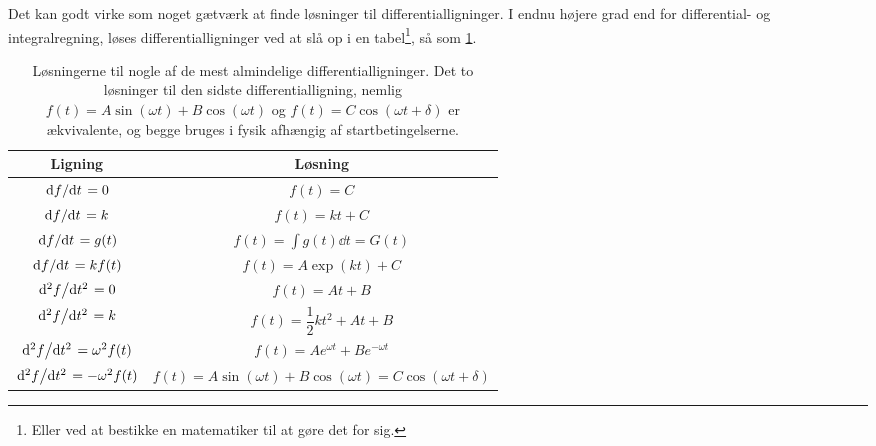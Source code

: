 Det kan godt virke som noget gætværk at finde løsninger til differentialligninger.
I endnu højere grad end for differential- og integralregning, løses differentialligninger ved at slå op i en tabel\footnote{Eller ved at bestikke en matematiker til at gøre det for sig.}, så som \cref{mat:tab:diffligninger}.
%
\setlength{\tabcolsep}{1 em}
\renewcommand{\arraystretch}{1.6}
\begin{table}[]
    \centering
    \begin{tabular}{cc}%
        \toprule
        Ligning & Løsning \\%
        \midrule
        $\dv*{f}{t}=0$ & $f(t)=C$ \\
        $\dv*{f}{t}=k$ & $f(t)=kt+C$ \\
        $\dv*{f}{t}=g(t)$ & $f(t)=\displaystyle\int g(t)\dd{t}=G(t)$ \\%
        $\dv*{f}{t}=kf(t)$ & $f(t)= A\exp(kt)+C$ \\
        $\dv*[2]{f}{t}=0$ & $f(t)=At+B$ \\
        $\dv*[2]{f}{t}=k$ & $f(t)=\dfrac{1}{2}kt^2+At+B$ \\
        $\dv*[2]{f}{t}=\omega^2 f(t)$ & $f(t)= Ae^{\omega t} + Be^{-\omega t}$ \\
        $\dv*[2]{f}{t}=-\omega^2 f(t)$ & $f(t)=A\sin(\omega t)+B\cos(\omega t) = C\cos(\omega t+\delta)$ \\
        \bottomrule
    \end{tabular}
    \caption{Løsningerne til nogle af de mest almindelige differentialligninger. Det to løsninger til den sidste differentialligning, nemlig $f(t)=A\sin(\omega t)+B\cos(\omega t)$ og $f(t) = C\cos(\omega t+\delta)$ er ækvivalente, og begge bruges i fysik afhængig af startbetingelserne.}
    \label{mat:tab:diffligninger}
\end{table}

